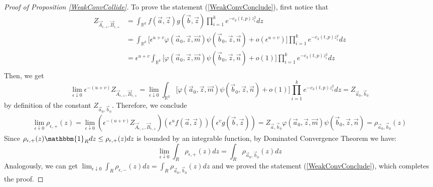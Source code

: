 \begin{proof}[Proof of Proposition \ref{WeakConvCollide}]
To prove the statement (\ref{WeakConvConclude}), first notice that
\begin{align*}
	Z_{\vec{A}_{\epsilon,+},\vec{B}_{\epsilon,+}}&=\int_{\mathbb{R}^{k}}f(\vec{a},\vec{z})g(\vec{b},\vec{z})\prod_{i=1}^{k}e^{-c_{3}(t,p)z^{2}_{i}}dz\\
	&=\int_{\mathbb{R}^{k}}\big[\epsilon^{u+v}\varphi(\vec{a}_{0},\vec{z},\vec{m})\psi(\vec{b}_{0},\vec{z},\vec{n})+o(\epsilon^{u+v})\big]\prod_{i=1}^{k}e^{-c_{3}(t,p)z^{2}_{i}}dz\\
	&=\epsilon^{u+v}\int_{\mathbb{R}^{k}}\big[\varphi(\vec{a}_{0},\vec{z},\vec{m})\psi(\vec{b}_{0},\vec{z},\vec{n})+o(1)\big]\prod_{i=1}^{k}e^{-c_{3}(t,p)z^{2}_{i}}dz\\
\end{align*}
Then, we get
$$\lim_{\epsilon\downarrow 0} \epsilon^{-(u+v)} Z_{\vec{A}_{\epsilon,+},\vec{B}_{\epsilon,+}}=\lim_{\epsilon\downarrow 0}\int_{\mathbb{R}^{k}}\big[\varphi(\vec{a}_{0},\vec{z},\vec{m})\psi(\vec{b}_{0},\vec{z},\vec{n})+o(1)\big]\prod_{i=1}^{k}e^{-c_{3}(t,p)z^{2}_{i}}dz=Z_{\vec{a}_{0},\vec{b}_{0}}$$
by definition of the constant $Z_{\vec{a}_{0},\vec{b}_{0}}$.
Therefore, we conclude
\begin{align*}
	\lim_{\epsilon\downarrow 0}\rho_{\epsilon,+}(z)=\lim_{\epsilon\downarrow 0}(\epsilon^{-(u+v)}Z_{\vec{A}_{\epsilon,+},\vec{B}_{\epsilon,+}})(\epsilon^{u}f(\vec{a},\vec{z}))(\epsilon^{v}g(\vec{b},\vec{z}))=Z_{\vec{a},\vec{b}_{0}}\varphi(\vec{a}_{0},\vec{z},\vec{m})\psi(\vec{b}_{0},\vec{z},\vec{n})=\rho_{\vec{a}_{0},\vec{b}_{0}}(z)
\end{align*}
Since $\rho_{\epsilon,+}(z)\mathbbm{1}_{R}dz\leq\rho_{\epsilon,+}(z)dz$ is bounded by an integrable function, by Dominated Convergence Theorem we have: $$\lim_{\epsilon\downarrow 0}\int_{R}\rho_{\epsilon,+}(z)dz=\int_{R}\rho_{\vec{a}_{0},\vec{b}_{0}}(z)dz$$ Analogously, we can get $\lim_{\epsilon\downarrow 0}\int_{R}\rho_{\epsilon,-}(z)dz=\int_{R}\rho_{\vec{a}_{0},\vec{b}_{0}}(z)dz$ and we proved the statement (\ref{WeakConvConclude}), which completes the proof.
\end{proof}

